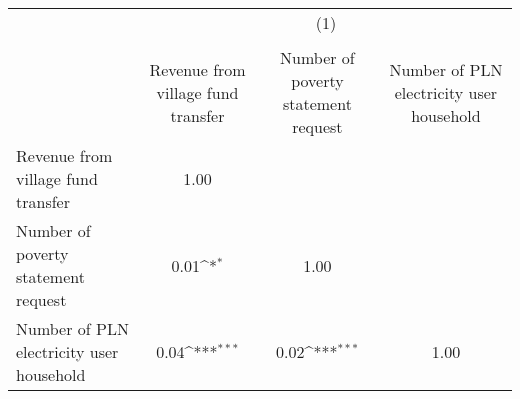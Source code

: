 {
\def\sym#1{\ifmmode^{#1}\else\(^{#1}\)\fi}
\begin{tabular}{l*{3}{c}}
\hline\hline
                &\multicolumn{3}{c}{(1)}                                 \\
                &\multicolumn{3}{c}{}                                    \\
                &Revenue from village fund transfer         &Number of poverty statement request         &Number of PLN electricity user household         \\
\hline
Revenue from village fund transfer&     1.00         &                  &                  \\
Number of poverty statement request&     0.01\sym{*}  &     1.00         &                  \\
Number of PLN electricity user household&     0.04\sym{***}&     0.02\sym{***}&     1.00         \\
\hline\hline
\end{tabular}
}
